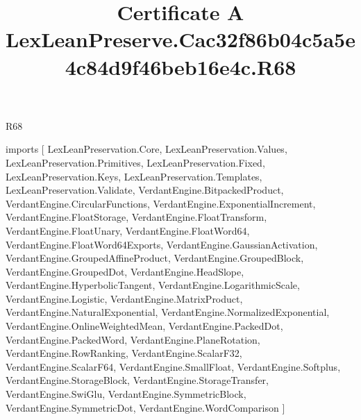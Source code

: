 \begin{lexlean}{R68}
\title{Certificate A LexLeanPreserve.Cac32f86b04c5a5e4c84d9f46beb16e4c.R68}
\begin{coremodule}
imports [
  LexLeanPreservation.Core,
  LexLeanPreservation.Values,
  LexLeanPreservation.Primitives,
  LexLeanPreservation.Fixed,
  LexLeanPreservation.Keys,
  LexLeanPreservation.Templates,
  LexLeanPreservation.Validate,
  VerdantEngine.BitpackedProduct,
  VerdantEngine.CircularFunctions,
  VerdantEngine.ExponentialIncrement,
  VerdantEngine.FloatStorage,
  VerdantEngine.FloatTransform,
  VerdantEngine.FloatUnary,
  VerdantEngine.FloatWord64,
  VerdantEngine.FloatWord64Exports,
  VerdantEngine.GaussianActivation,
  VerdantEngine.GroupedAffineProduct,
  VerdantEngine.GroupedBlock,
  VerdantEngine.GroupedDot,
  VerdantEngine.HeadSlope,
  VerdantEngine.HyperbolicTangent,
  VerdantEngine.LogarithmicScale,
  VerdantEngine.Logistic,
  VerdantEngine.MatrixProduct,
  VerdantEngine.NaturalExponential,
  VerdantEngine.NormalizedExponential,
  VerdantEngine.OnlineWeightedMean,
  VerdantEngine.PackedDot,
  VerdantEngine.PackedWord,
  VerdantEngine.PlaneRotation,
  VerdantEngine.RowRanking,
  VerdantEngine.ScalarF32,
  VerdantEngine.ScalarF64,
  VerdantEngine.SmallFloat,
  VerdantEngine.Softplus,
  VerdantEngine.StorageBlock,
  VerdantEngine.StorageTransfer,
  VerdantEngine.SwiGlu,
  VerdantEngine.SymmetricBlock,
  VerdantEngine.SymmetricDot,
  VerdantEngine.WordComparison
]


\end{coremodule}
\end{lexlean}
